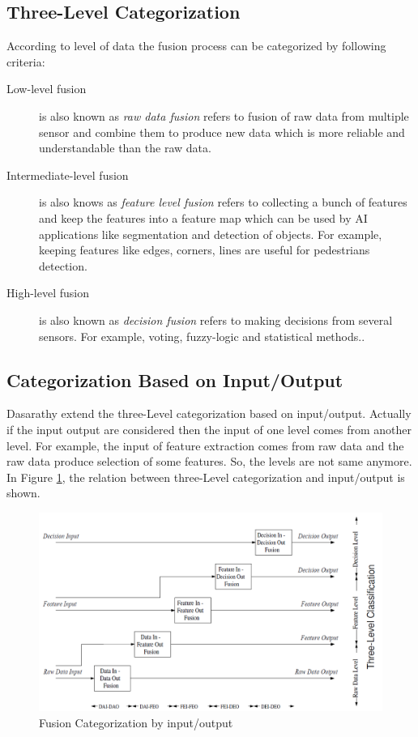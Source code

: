 \subsection{Three-Level Categorization}
According to level of data the fusion process can be categorized by following criteria:
\begin{description}
    \item[Low-level fusion] is also known as \emph{raw data fusion} refers to fusion of raw data from multiple sensor and combine them to produce new data which is more reliable and understandable than the raw data.
    \item[Intermediate-level fusion] is also knows as \emph{feature level fusion} refers to collecting a bunch of features and keep the features into a feature map which can be used by AI applications like segmentation and detection of objects. For example, keeping features like edges, corners, lines are useful for pedestrians detection.
    \item[High-level fusion] is also known as \emph{decision fusion} refers to making decisions from several sensors. For example, voting, fuzzy-logic and statistical methods.\cite{Wilfried2002}.
\end{description}

\subsection{Categorization Based on Input/Output}
Dasarathy extend the three-Level categorization based on input/output\cite{Wilfried2002}. Actually if the input output are considered then the input of one level comes from another level. For example, the input of feature extraction comes from raw data and the raw data produce selection of some features. So, the levels are not same anymore.  In Figure \ref{fig:InputoutputCat}, the relation between three-Level categorization and input/output is shown.
\begin{figure}
  \centering
  \includegraphics[width=1.1\textwidth]{src/pic/InputoutputCat.png}
  \caption{Fusion Categorization by input/output}
  \label{fig:InputoutputCat}
\end{figure}

